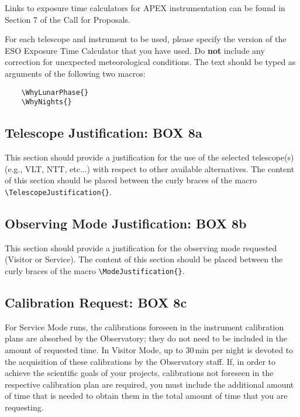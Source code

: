 \documentclass{article}
\begin{document}
Links to exposure time calculators for APEX instrumentation
  can be found in Section 7 of the Call for Proposals.

For each telescope and instrument to be used, please specify the
version of the ESO Exposure Time Calculator that you have
used. Do {\bf not} include any correction for unexpected
meteorological conditions. The text should be typed as arguments of
the following two macros:
\begin{verbatim}
    \WhyLunarPhase{}
    \WhyNights{}
\end{verbatim} 


\subsection{Telescope Justification: {\bf BOX 8a}}
This section should provide a justification for the use of the selected telescope(s) (e.g., VLT, NTT, etc...) with respect to other available alternatives. The content of this section should be placed between the curly
braces of the macro \verb|\TelescopeJustification{}|.


\subsection{Observing Mode Justification: {\bf BOX 8b}}
This section should provide a justification for the observing mode requested (Visitor or Service). The
content of this section should be placed between the curly braces of the macro \verb|\ModeJustification{}|.

\subsection{Calibration Request: {\bf BOX 8c}}

For Service Mode runs, the calibrations foreseen in the instrument
calibration plans are 
absorbed by the Observatory; they do not need to be included in the
amount of requested time. In Visitor Mode, up to
30\,min per night is devoted to the acquisition of these calibrations
by the Observatory staff. If, in order to achieve the scientific goals
of your projects, calibrations not foreseen in the respective
calibration plan are required, you must include the additional amount
of time that is needed to obtain them in the total amount of time that
you are requesting. 
\end{document}
